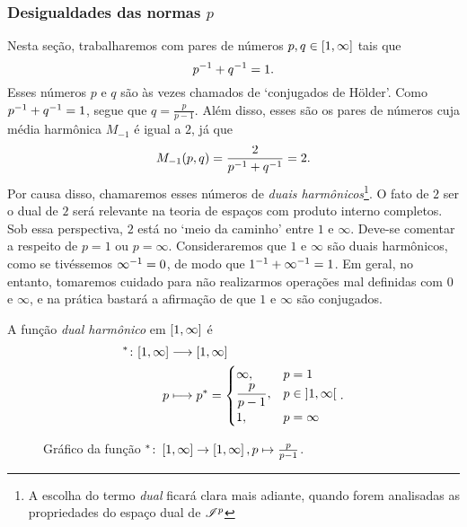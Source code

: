 \subsubsection{Desigualdades das normas \ensuremath{p}}

Nesta seção, trabalharemos com pares de números $p,q \in \left[1,\allowbreak \infty\right]$ tais que
	\begin{equation*}
	p^{-1} + q^{-1} = 1.
	\end{equation*}
Esses números $p$ e $q$ são às vezes chamados de `conjugados de Hölder'. Como $p^{-1} + q^{-1} = 1$, segue que $q = \frac{p}{p-1}$. Além disso, esses são os pares de números cuja média harmônica $M_{-1}$ é igual a $2$, já que
	\begin{equation*}
	M_{-1}(p,q) = \frac{2}{p^{-1} + q^{-1}} = 2.
	\end{equation*}
Por causa disso, chamaremos esses números de \textit{duais harmônicos}\footnote{A escolha do termo \textit{dual} ficará clara mais adiante, quando forem analisadas as propriedades do espaço dual de $\mathscr{I}^p$}. O fato de $2$ ser o dual de $2$ será relevante na teoria de espaços com produto interno completos. Sob essa perspectiva, $2$ está no `meio da caminho' entre $1$ e $\infty$. Deve-se comentar a respeito de $p=1$ ou $p=\infty$. Consideraremos que $1$ e $\infty$ são duais harmônicos, como se tivéssemos $\infty^{-1}=0$, de modo que $1^{-1} + \infty^{-1} = 1$. Em geral, no entanto, tomaremos cuidado para não realizarmos operações mal definidas com $0$ e $\infty$, e na prática bastará a afirmação de que $1$ e $\infty$ são conjugados.

\begin{definition}
A função \emph{dual harmônico} em $\left[1,\allowbreak \infty\right]$ é
	\begin{align*}
	{^{\ast}}\colon {\left[1,\allowbreak \infty\right]} &\longrightarrow {\left[1,\allowbreak \infty\right]} \\{p} &\longmapsto p^{\ast} =
	\begin{cases}
		\infty,& p=1 \\
		\displaystyle\frac{p}{p-1},& p \in \left]1,\allowbreak \infty\right[ \\
		1,& p=\infty
	\end{cases}
	.
	\end{align*}
\end{definition}

\begin{figure}
\centering
{}
\caption{Gráfico da função $^{\ast}\colon \left[1,\allowbreak \infty\right] \to \left[1,\allowbreak \infty\right], p \mapsto \frac{p}{p-1}$.}
\label{fig:dual.harmonico}
\end{figure}

